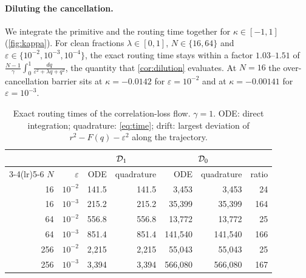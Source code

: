 \paragraph{Diluting the cancellation.} We integrate the primitive and the routing time together for $\kappa\in[-1,1]$ (\cref{fig:kappa}).
For clean fractions $\lambda\in[0,1]$, $N\in\{16,64\}$ and $\varepsilon\in\{10^{-2},10^{-3},10^{-4}\}$, the exact routing time stays within a factor $1.03$--$1.51$ of
$\tfrac{N-1}{\gamma}\int_0^1\tfrac{dq}{\varepsilon^2+\lambda q+q^2}$, the quantity that \cref{cor:dilution} evaluates. At $N=16$ the over-cancellation barrier sits at
$\kappa=-0.0142$ for $\varepsilon=10^{-2}$ and at $\kappa=-0.00141$ for $\varepsilon=10^{-3}$.

\begin{table}[t]
\caption{Exact routing times of the correlation-loss flow. $\gamma=1$. ODE: direct integration; quadrature: \cref{eq:time}; drift:
largest deviation of $r^2-F(q)-\varepsilon^2$ along the trajectory.}
\label{tab:quadrature}
\centering\small
\begin{tabular}{@{}rr rr rr r@{}}
\toprule
 & & \multicolumn{2}{c}{$\mathcal D_{1}$} & \multicolumn{2}{c}{$\mathcal D_{0}$} & \\
\cmidrule(lr){3-4}\cmidrule(lr){5-6}
$N$ & $\varepsilon$ & ODE & quadrature & ODE & quadrature & ratio\\
\midrule
16  & $10^{-2}$ & 141.5  & 141.5  & 3{,}453   & 3{,}453   & 24\\
16  & $10^{-3}$ & 215.2  & 215.2  & 35{,}399  & 35{,}399  & 164\\
64  & $10^{-2}$ & 556.8  & 556.8  & 13{,}772  & 13{,}772  & 25\\
64  & $10^{-3}$ & 851.4  & 851.4  & 141{,}540 & 141{,}540 & 166\\
256 & $10^{-2}$ & 2{,}215 & 2{,}215 & 55{,}043  & 55{,}043  & 25\\
256 & $10^{-3}$ & 3{,}394 & 3{,}394 & 566{,}080 & 566{,}080 & 167\\
\bottomrule
\end{tabular}
\end{table}

